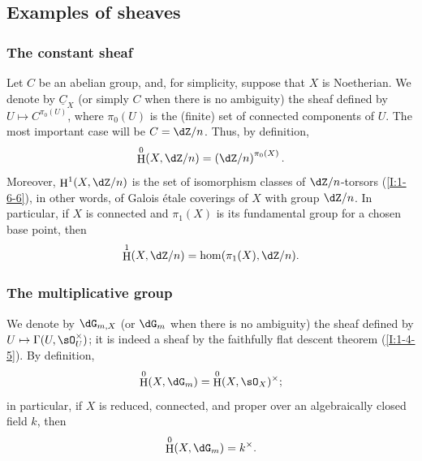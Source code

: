 \documentclass[12pt,oneside,english]{smfbook}
\DeclareMathOperator{\h}{H}
\newcommand{\const}[1]{\underline{#1}}
\begin{document}
\subsection{Examples of sheaves}\label{I:2-2}

\subsubsection{The constant sheaf}\label{I:2-2-1}

Let $C$ be an abelian group, and, for simplicity, suppose that $X$ is Noetherian. We denote by $\const C_X$ (or simply $C$ when there is no ambiguity) the sheaf defined by $U\mapsto C^{\pi_0(U)}$, where $\pi_0(U)$ is the (finite) set of connected components of $U$. The most important case will be $C=\dZ/n$. Thus, by definition,
\[
  \h^0(X,\dZ/n)=\left(\dZ/n\right)^{\pi_0(X)}\text{.}
\]
Moreover, $\h^1(X,\dZ/n)$ is the set of isomorphism classes of $\dZ/n$-torsors (\ref{I:1-6-6}), in other words, of Galois étale coverings of $X$ with group $\dZ/n$. In particular, if $X$ is connected and $\pi_1(X)$ is its fundamental group for a chosen base point, then
\[
  \h^1(X,\dZ/n) = \hom(\pi_1(X),\dZ/n)\text{.}
\]

\subsubsection{The multiplicative group}\label{I:2-2-2}

We denote by $\dG_{m,X}$ (or $\dG_m$ when there is no ambiguity) the sheaf defined by $U\mapsto\Gamma(U,\sO_U^\times)$; it is indeed a sheaf by the faithfully flat descent theorem (\ref{I:1-4-5}). By definition,
\[
  \h^0(X,\dG_m) = \h^0(X,\sO_X)^\times\text{;}
\]
in particular, if $X$ is reduced, connected, and proper over an algebraically closed field $k$, then
\[
  \h^0(X,\dG_m) = k^\times\text{.}
\]
\end{document}
